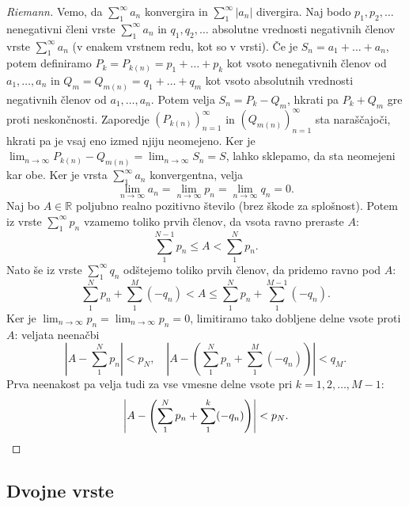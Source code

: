 \documentclass[10pt, a4paper]{article}
\newenvironment{noticeC}{%
  \tcolorbox[%
  notitle,
  empty,
  enhanced,  %
  breakable,
  coltext=black, 
  fontupper=\rmfamily,
  noparskip,
  sharp corners,
  boxrule=-1pt,  %
  frame hidden,
  left=7pt,  %
  right=7pt,
  top=5pt,
  bottom=5pt,
  before skip=2.5ex plus 2pt,
  after skip=2.5ex plus 2pt,
  overlay unbroken and last={%
  },
  ]}
{\endtcolorbox}
\newenvironment{dokaz}%
  {\begin{noticeC}\begin{proof}}%
  {\end{proof}\end{noticeC}}
\newcommand{\R}{\mathbb {R}}
\newcommand{\limzap}[1]{\lim_{n \to \infty} {#1}}
\begin{document}
\begin{dokaz}[Riemann]
    Vemo, da $\sum_1 ^\infty a_n$ konvergira in $\sum_1 ^\infty |a_n|$ divergira.
    Naj bodo $p_1, p_2, \dots$ nenegativni členi vrste $\sum_1 ^\infty a_n$ in $q_1, q_2, \dots$ absolutne vrednosti negativnih členov vrste $\sum_1 ^\infty a_n$ (v enakem vrstnem redu, kot so v vrsti).
    Če je $S_n = a_1 + \dots + a_n$, potem definiramo $P_k = P_{k(n)} = p_1 + \dots + p_k$ kot vsoto nenegativnih členov od $a_1, \dots, a_n$ in
    $Q_m = Q_{m(n)} = q_1 + \dots + q_m$ kot vsoto absolutnih vrednosti negativnih členov od $a_1, \dots, a_n$.
    Potem velja $S_n = P_k - Q_m$, hkrati pa $P_k + Q_m$ gre proti neskončnosti.
    Zaporedje $({P_{k(n)}})_{n=1} ^\infty$ in $({Q_{m(n)}})_{n=1} ^\infty$ sta naraščajoči, hkrati pa je vsaj eno izmed njiju neomejeno.
    Ker je $\limzap{P_{k(n)} - Q_{m(n)}} = \limzap{S_n} = S$, lahko sklepamo, da sta neomejeni kar obe.
    Ker je vrsta $\sum_1 ^\infty a_n$ konvergentna, velja $$\limzap{a_n} = \limzap{p_n} = \limzap{q_n} = 0.$$
    Naj bo $A \in \R$ poljubno realno pozitivno število (brez škode za splošnost).
    Potem iz vrste $\sum_1 ^\infty p_n$ vzamemo toliko prvih členov, da vsota ravno preraste $A$:
    $$\sum_1 ^{N-1} p_n \leq A < \sum_1 ^{N} p_n.$$
    Nato še iz vrste $\sum_1 ^\infty q_n$ odštejemo toliko prvih členov, da pridemo ravno pod $A$:
    $$\sum_1 ^{N} p_n + \sum_1 ^{M} (-q_n) < A \leq \sum_1 ^N p_n + \sum_1 ^{M-1} (-q_n).$$
    Ker je $\limzap{p_n} = \limzap{p_n} = 0$, limitiramo tako dobljene delne vsote proti $A$: veljata neenačbi
    $$\left| A - \sum_1 ^N p_n \right| < p_N,\quad \left| A - \left(\sum_1 ^N p_n + \sum_1 ^M (-q_n) \right) \right| < q_M.$$
    Prva neenakost pa velja tudi za vse vmesne delne vsote pri $k = 1, 2, \dots, M-1$:
    \begin{equation*}
        \left| A - \left(\sum_1 ^N p_n + \sum_1 ^k (-q_n) \right) \right| < p_N. \qedhere
    \end{equation*}
\end{dokaz}

\subsection{Dvojne vrste}
\end{document}

